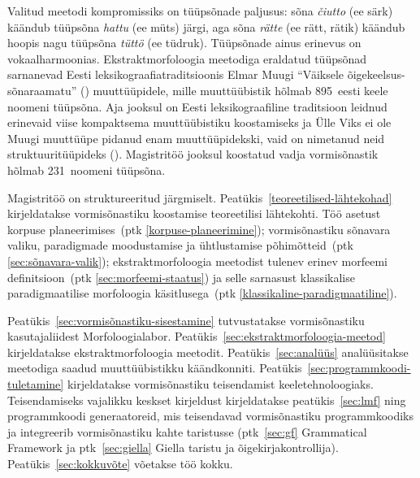 \documentclass[12pt,a4paper]{article}
\newcommand{\vadja}[1]{\textit{#1}}
\begin{document}
Valitud meetodi kompromissiks on tüüpsõnade paljusus: sõna \vadja{čiutto} (ee särk) käändub tüüpsõna \vadja{hattu} (ee müts) järgi, aga sõna \vadja{rätte} (ee rätt, rätik) käändub hoopis nagu tüüpsõna \vadja{tüttö} (ee tüdruk). Tüüp\-sõnade ainus erinevus on vokaalharmoonias. Ekstrakt\-morfoloogia meetodiga eraldatud tüüpsõnad sarnanevad Eesti leksikograafia\-traditsioonis Elmar Muugi \enquote{Väiksele õigekeelsus-sõnaraamatu} (\citeyear{muuk_vaike_1933}) muuttüüpidele, mille muuttüübistik hõlmab 895~eesti keele noomeni tüüpsõna. Aja jooksul on Eesti leksikograafiline traditsioon leidnud erinevaid viise kompaktsema muuttüübistiku koostamiseks ja Ülle Viks ei ole Muugi muuttüüpe pidanud enam muuttüüpidekski, vaid on nimetanud neid struktuuri\-tüüpideks (\cite[282]{viks_verbide_1976}). Magistritöö jooksul koostatud vadja vormisõnastik hõlmab 231~noomeni tüüpsõna. %


Magistritöö on struktureeritud järgmiselt. 
Peatükis~\ref{teoreetilised-lähtekohad} kirjeldatakse vormisõnastiku koostamise teoreetilisi lähtekohti. Töö asetust korpuse planeerimises~(ptk \ref{korpuse-planeerimine}); vormisõnastiku sõnavara valiku, paradigmade moodustamise ja ühtlustamise põhimõtteid~(ptk \ref{sec:sõnavara-valik}); ekstrakt\-morfo\-loogia meetodist tulenev erinev morfeemi definitsioon~(ptk \ref{sec:morfeemi-staatus}) ja selle sarnasust klassikalise paradigmaatilise morfoloogia käsitlusega~(ptk \ref{klassikaline-paradigmaatiline}). %

Peatükis~\ref{sec:vormisõnastiku-sisestamine} tutvustatakse vormisõnastiku kasutajaliidest Morfoloogia\-labor. 
Peatükis~\ref{sec:ekstraktmorfoloogia-meetod} kirjeldatakse ekstraktmorfoloogia meetodit. 
Peatükis~\ref{sec:analüüs} analüüsitakse meetodiga saadud muuttüübistikku käändkonniti. 
Peatükis~\ref{sec:programmkoodi-tuletamine} kirjeldatakse vormisõnastiku teisendamist keele\-tehnoloogiaks. Teisendamiseks vajalikku keskset kirjeldust kirjeldatakse peatükis~\ref{sec:lmf} ning programm\-koodi generaatoreid, mis teisendavad vormi\-sõnastiku programm\-koodiks ja integreerib vormisõnastiku kahte taristusse (ptk~\ref{sec:gf} Grammatical Framework ja ptk~\ref{sec:giella} Giella taristu ja õigekirjakontrollija).
Peatükis~\ref{sec:kokkuvõte} võetakse töö kokku.
\end{document}

